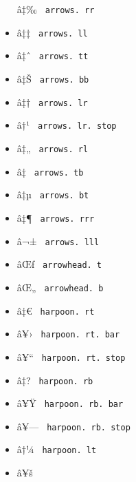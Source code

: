 \begin{itemize}
  \label{symbol-arrows.rr}{{ â‡‰ }
  \texttt{\ arrows.\ rr\ }}
\item
  \label{symbol-arrows.ll}{{ â‡‡ }
  \texttt{\ arrows.\ ll\ }}
\item
  \label{symbol-arrows.tt}{{ â‡ˆ }
  \texttt{\ arrows.\ tt\ }}
\item
  \label{symbol-arrows.bb}{{ â‡Š }
  \texttt{\ arrows.\ bb\ }}
\item
  \label{symbol-arrows.lr}{{ â‡† }
  \texttt{\ arrows.\ lr\ }}
\item
  \label{symbol-arrows.lr.stop}{{ â†¹ }
  \texttt{\ arrows.\ lr.\ stop\ }}
\item
  \label{symbol-arrows.rl}{{ â‡„ }
  \texttt{\ arrows.\ rl\ }}
\item
  \label{symbol-arrows.tb}{{ â‡ }
  \texttt{\ arrows.\ tb\ }}
\item
  \label{symbol-arrows.bt}{{ â‡µ }
  \texttt{\ arrows.\ bt\ }}
\item
  \label{symbol-arrows.rrr}{{ â‡¶ }
  \texttt{\ arrows.\ rrr\ }}
\item
  \label{symbol-arrows.lll}{{ â¬± }
  \texttt{\ arrows.\ lll\ }}
\item
  \label{symbol-arrowhead.t}{{ âŒƒ }
  \texttt{\ arrowhead.\ t\ }}
\item
  \label{symbol-arrowhead.b}{{ âŒ„ }
  \texttt{\ arrowhead.\ b\ }}
\item
  \label{symbol-harpoon.rt}{{ â‡€ }
  \texttt{\ harpoon.\ rt\ }}
\item
  \label{symbol-harpoon.rt.bar}{{ â¥› }
  \texttt{\ harpoon.\ rt.\ bar\ }}
\item
  \label{symbol-harpoon.rt.stop}{{ â¥`` }
  \texttt{\ harpoon.\ rt.\ stop\ }}
\item
  \label{symbol-harpoon.rb}{{ â‡? }
  \texttt{\ harpoon.\ rb\ }}
\item
  \label{symbol-harpoon.rb.bar}{{ â¥Ÿ }
  \texttt{\ harpoon.\ rb.\ bar\ }}
\item
  \label{symbol-harpoon.rb.stop}{{ â¥--- }
  \texttt{\ harpoon.\ rb.\ stop\ }}
\item
  \label{symbol-harpoon.lt}{{ â†¼ }
  \texttt{\ harpoon.\ lt\ }}
\item
  \label{symbol-harpoon.lt.bar}{{ â¥š }
}
\end{itemize}
